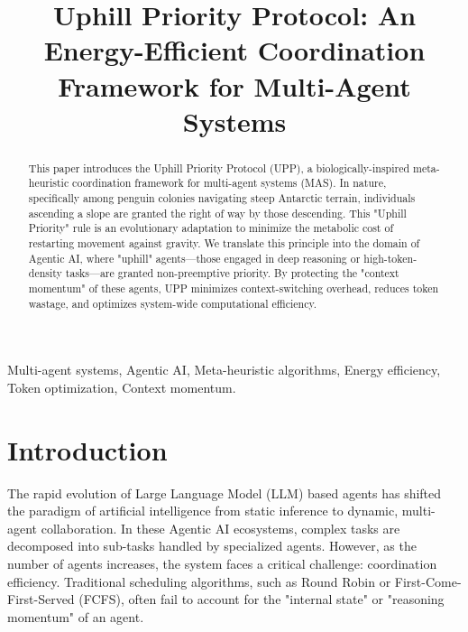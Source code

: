 \documentclass[conference]{IEEEtran}
\begin{document}
\title{Uphill Priority Protocol: An Energy-Efficient Coordination Framework for Multi-Agent Systems}

\author{
\and
{}
}

\maketitle

\begin{abstract}
This paper introduces the Uphill Priority Protocol (UPP), a biologically-inspired meta-heuristic coordination framework for multi-agent systems (MAS). In nature, specifically among penguin colonies navigating steep Antarctic terrain, individuals ascending a slope are granted the right of way by those descending. This "Uphill Priority" rule is an evolutionary adaptation to minimize the metabolic cost of restarting movement against gravity. We translate this principle into the domain of Agentic AI, where "uphill" agents—those engaged in deep reasoning or high-token-density tasks—are granted non-preemptive priority. By protecting the "context momentum" of these agents, UPP minimizes context-switching overhead, reduces token wastage, and optimizes system-wide computational efficiency.
\end{abstract}

\begin{IEEEkeywords}
Multi-agent systems, Agentic AI, Meta-heuristic algorithms, Energy efficiency, Token optimization, Context momentum.
\end{IEEEkeywords}

\section{Introduction}
The rapid evolution of Large Language Model (LLM) based agents has shifted the paradigm of artificial intelligence from static inference to dynamic, multi-agent collaboration. In these Agentic AI ecosystems, complex tasks are decomposed into sub-tasks handled by specialized agents. However, as the number of agents increases, the system faces a critical challenge: coordination efficiency. Traditional scheduling algorithms, such as Round Robin or First-Come-First-Served (FCFS), often fail to account for the "internal state" or "reasoning momentum" of an agent.
\end{document}
